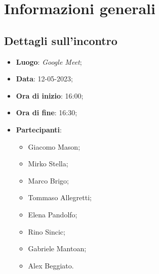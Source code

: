 \section{Informazioni generali}

\subsection{Dettagli sull'incontro}
\begin{itemize}
\item \textbf{Luogo}: \textit{Google Meet};
\item \textbf{Data}: 12-05-2023;
\item \textbf{Ora di inizio}: 16:00;
\item \textbf{Ora di fine}: 16:30;
\item \textbf{Partecipanti}: 
\begin{itemize}
	\item Giacomo Mason;
	\item Mirko Stella;
	\item Marco Brigo;
	\item Tommaso Allegretti;
	\item Elena Pandolfo;
	\item Rino Sincic;
	\item Gabriele Mantoan;
	\item Alex Beggiato.
\end{itemize}
\end{itemize}